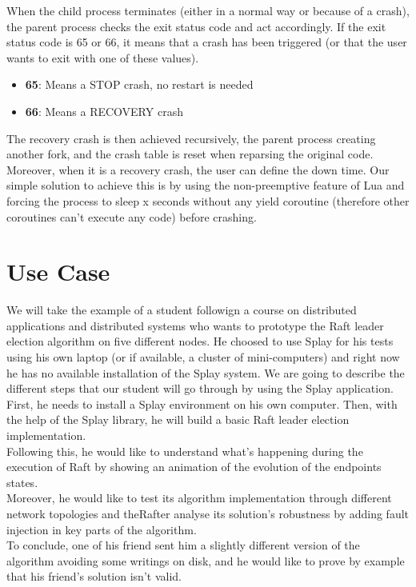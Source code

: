 \documentclass{eplmastersthesis}
\begin{document}
          When the child process terminates (either in a normal way or because
          of a crash), the parent process checks the exit status code and act
          accordingly. If the exit status code is 65 or 66, it means that a
          crash has been triggered (or that the user wants to exit
          with one of these values).

          \begin{itemize}
            \item \textbf{65}: Means a STOP crash, no restart is needed
            \item \textbf{66}: Means a RECOVERY crash
          \end{itemize}

          The recovery crash is then achieved recursively, the parent process
          creating another fork, and the crash table is reset when reparsing
          the original code. Moreover, when it is a recovery crash, the user
          can define the down time. Our simple solution to achieve this is by
          using the non-preemptive feature of Lua and forcing the process
          to sleep x seconds without any yield coroutine (therefore other
          coroutines can't execute any code) before crashing.

    \chapter{Use Case}

      We will take the example of a student followign a course on distributed
      applications and distributed systems who wants to prototype the Raft
      leader election algorithm on five different nodes. He choosed to use
      Splay for his tests using his own laptop (or if available, a cluster
      of mini-computers) and right now he has no available installation of the
      Splay system. We are going to describe the different steps that our
      student will go through by using the Splay application.\\

      First, he needs to install a Splay environment on his own computer. Then,
      with the help of the Splay library, he will build a basic Raft leader
      election implementation.\\
      Following this, he would like to understand what's happening during the
      execution of Raft by showing an animation of the evolution of the
      endpoints states.\\
      Moreover, he would like to test its algorithm implementation through
      different network topologies and theRafter analyse its solution's
      robustness by adding fault injection in key parts of the algorithm.\\
      To conclude, one of his friend sent him a slightly different version
      of the algorithm avoiding some writings on disk, and he would like to
      prove by example that his friend's solution isn't valid.
\end{document}
